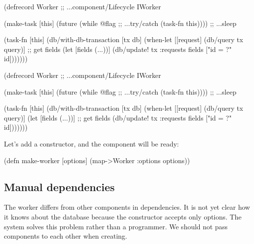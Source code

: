 \ifnarrow

\begin{english}
  \begin{clojure}
(defrecord Worker
  ;; ...component/Lifecycle
  IWorker

  (make-task [this]
    (future
      (while @flag    ;; ...try/catch
        (task-fn this)))) ;; ...sleep

  (task-fn [this]
    (db/with-db-transaction [tx db]
      (when-let [[request]
                 (db/query tx query)]
        ;; get fields
        (let [fields (...))]
          (db/update! tx :requests
            fields ["id = ?" id]))))))
  \end{clojure}
\end{english}

\else

\begin{english}
  \begin{clojure}
(defrecord Worker
  ;; ...component/Lifecycle
  IWorker

  (make-task [this]
    (future
      (while @flag        ;; ...try/catch
        (task-fn this)))) ;; ...sleep

  (task-fn [this]
    (db/with-db-transaction [tx db]
      (when-let [[request] (db/query tx query)]
        (let [fields (...))] ;; get fields
          (db/update! tx :requests
                      fields ["id = ?" id]))))))
  \end{clojure}
\end{english}

\fi

\noindent
Let's add a constructor, and the component will be ready:


\begin{english}
  \begin{clojure}
(defn make-worker
  [options]
  (map->Worker {:options options}))
  \end{clojure}
\end{english}

\subsection{Manual dependencies}


The worker differs from other components in dependencies. It is not yet clear how it knows about the database because the constructor accepts only options. The system solves this problem rather than a programmer. We should not pass components to each other when creating.

